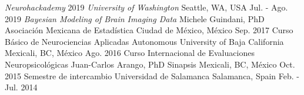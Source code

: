\begin{cvcourses}
    \cvcourse
        {\textit{Neurohackademy} 2019}
        {}
        {\textit{University of Washington}}
        {Seattle, WA, USA}
        {Jul. - Ago. 2019}
    \cvcourse
        {\textit{Bayesian Modeling of Brain Imaging Data}}
        {Michele Guindani, PhD}
        {Asociación Mexicana de Estadística}
        {Ciudad de México, México}
        {Sep. 2017}
    \cvcourse
        {Curso Básico de Neurociencias Aplicadas}
        {}
        {Autonomous University of Baja California}
        {Mexicali, BC, México}
        {Ago. 2016}
    \cvcourse
        {Curso Internacional de Evaluaciones Neuropsicológicas}
        {Juan-Carlos Arango, PhD}
        {Sinapsis}
        {Mexicali, BC, México}
        {Oct. 2015}
    \cvcourse
        {Semestre de intercambio}
        {}
        {Universidad de Salamanca}
        {Salamanca, Spain}
        {Feb. - Jul. 2014}
\end{cvcourses}

